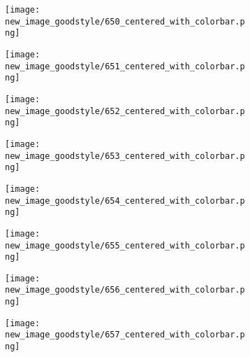 \documentclass[a4paper,12pt]{article}
\begin{document}
\begin{figure}[H]
  \begin{subfigure}{0.11\textwidth}
    \texttt{[image: new\_image\_goodstyle/650\_centered\_with\_colorbar.png]}
  \end{subfigure}
  \hfill
  \begin{subfigure}{0.11\textwidth}
    \texttt{[image: new\_image\_goodstyle/651\_centered\_with\_colorbar.png]}
  \end{subfigure}
  \hfill
  \begin{subfigure}{0.11\textwidth}
    \texttt{[image: new\_image\_goodstyle/652\_centered\_with\_colorbar.png]}
  \end{subfigure}
  \hfill
  \begin{subfigure}{0.11\textwidth}
    \texttt{[image: new\_image\_goodstyle/653\_centered\_with\_colorbar.png]}
  \end{subfigure}
  \hfill
  \begin{subfigure}{0.11\textwidth}
    \texttt{[image: new\_image\_goodstyle/654\_centered\_with\_colorbar.png]}
  \end{subfigure}
  \hfill
  \begin{subfigure}{0.11\textwidth}
    \texttt{[image: new\_image\_goodstyle/655\_centered\_with\_colorbar.png]}
  \end{subfigure}
  \hfill
  \begin{subfigure}{0.11\textwidth}
    \texttt{[image: new\_image\_goodstyle/656\_centered\_with\_colorbar.png]}
  \end{subfigure}
  \hfill
  \begin{subfigure}{0.11\textwidth}
    \texttt{[image: new\_image\_goodstyle/657\_centered\_with\_colorbar.png]}
  \end{subfigure}
  \hfill
\end{figure}
\end{document}

